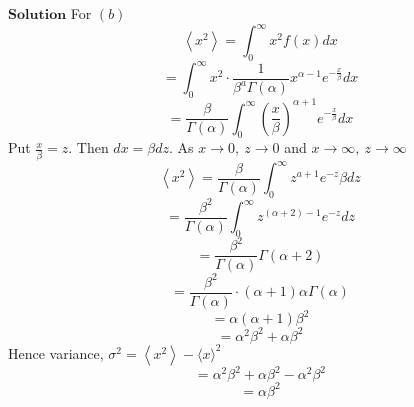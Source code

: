 $\boxed{\textbf{Solution}}$ For $(b)$ 
$$
\left\langle x^{2}\right\rangle=\int_{0}^{\infty} x^{2} f(x) d x
$$
$$=\int_{0}^{\infty} x^{2} \cdot \frac{1}{\beta^{a} \Gamma(\alpha)} x^{\alpha-1} e^{-\frac{x}{\beta}} d x$$
$$=\frac{\beta}{\Gamma(\alpha)} \int_{0}^{\infty}\left(\frac{x}{\beta}\right)^{\alpha+1} e^{-\frac{x}{\beta}} d x$$
Put $\frac{x}{\beta}=z .$ Then $d x=\beta d z .$ As $x \rightarrow 0, \  z \rightarrow 0$ and $x \rightarrow \infty, \  z \rightarrow \infty$
$$
\left\langle x^{2}\right\rangle=\frac{\beta}{\Gamma(\alpha)} \int_{0}^{\infty} z^{a+1} e^{-z} \beta d z
$$
$$=\frac{\beta^{2}}{\Gamma(\alpha)} \int_{0}^{\infty} z^{(\alpha+2)-1} e^{-z} d z$$
$$=\frac{\beta^{2}}{\Gamma(\alpha)} \Gamma(\alpha+2)$$
$$=\frac{\beta^{2}}{\Gamma(\alpha)} \cdot(\alpha+1) \alpha \Gamma(\alpha)$$
$$=\alpha(\alpha+1) \beta^{2}$$
$$=\alpha^{2} \beta^{2}+\alpha \beta^{2}$$
Hence variance, $\sigma^{2}=\left\langle x^{2}\right\rangle-\langle x\rangle^{2}$
$$=\alpha^{2} \beta^{2}+\alpha \beta^{2}-\alpha^{2} \beta^{2}$$
$$=\alpha \beta^{2}$$
